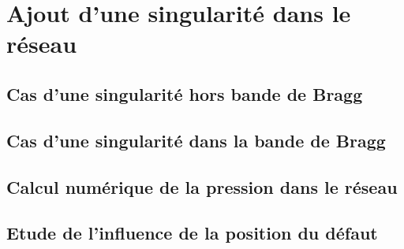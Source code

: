 \chapter{Ajout d'une singularité dans le réseau}
\section{Cas d'une singularité hors bande de Bragg}
\section{Cas d'une singularité dans la bande de Bragg}
\section{Calcul numérique de la pression dans le réseau}
\section{Etude de l'influence de la position du défaut}